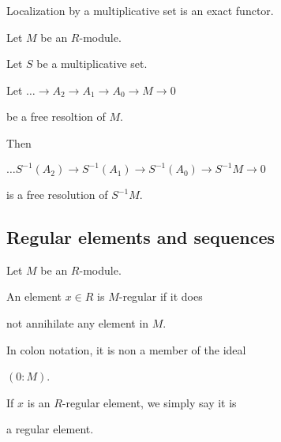 


\begin{lemma}

  \label{lem:loczn_exact}

  Localization by a multiplicative set is an exact functor.

\end{lemma}



\begin{lemma}

  \label{lem:loczn_of_resl_is_resl}


  Let $M$ be an $R$-module.

  Let $S$ be a multiplicative set.

  Let $\ldots \to A_2 \to A_1 \to A_0 \to M \to 0$

  be a free resoltion of $M$.

  Then

  $\ldots S^{-1}(A_2) \to S^{-1}(A_1) \to S^{-1}(A_0) \to S^{-1}M \to 0$

  is a free resolution of $S^{-1}M$.

\end{lemma}







\subsection{Regular elements and sequences}



\begin{definition}

  \label{def:reg_elt}

  Let $M$ be an $R$-module.

  An element $x \in R$ is $M$-regular if it does 

  not annihilate any element in $M$.

  In colon notation, it is non a member of the ideal

  $( 0 : M )$.

  If $x$ is an $R$-regular element, we simply say it is 

  a regular element.

\end{definition}



